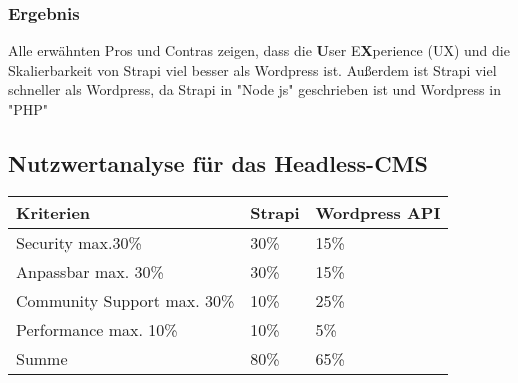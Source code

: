 \begin{spacing}{1}
    \subsubsection{Ergebnis}
    Alle erwähnten Pros und Contras zeigen, dass  die \textbf{U}ser E\textbf{X}perience (UX)
    und die Skalierbarkeit von Strapi viel besser als Wordpress ist.
    Außerdem ist Strapi viel schneller als Wordpress,
    da Strapi in "Node js" geschrieben ist und Wordpress in "PHP"
    \cite{strapi-vs-wordpress}

    \subsection{Nutzwertanalyse für das Headless-CMS}

    \begin{tabular}{ |p{3cm}|p{3cm}|p{3cm}| }
        \hline
        Kriterien                   & Strapi & Wordpress API \\
        \hline
        Security max.30\%           & 30\%   & 15\%          \\
        \hline
        Anpassbar max. 30\%         & 30\%   & 15\%          \\
        \hline
        Community Support max. 30\% & 10\%   & 25\%          \\
        \hline
        Performance max. 10\%       & 10\%   & 5\%           \\
        \hline
        Summe                       & 80\%   & 65\%          \\
        \hline
    \end{tabular}

\end{spacing}